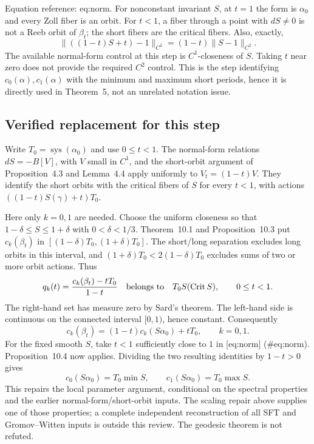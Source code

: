 \documentclass[10pt]{article}
\begin{document}
Equation reference: eq:norm. For nonconstant invariant \(S\), at \(t=1\) the form is \(\alpha_0\) and every Zoll fiber is an orbit. For \(t<1\), a fiber through a point with \(dS\ne0\) is not a Reeb orbit of \(\beta_t\); the short fibers are the critical fibers. Also, exactly, \[\|((1-t)S+t)-1\|_{C^2}=(1-t)\|S-1\|_{C^2}.
 \] The available normal-form control at this step is \(C^1\)-closeness of \(S\). Taking \(t\) near zero does not provide the required \(C^2\) control. This is the step identifying \(c_0(\alpha),c_1(\alpha)\) with the minimum and maximum short periods, hence it is directly used in Theorem 5, not an unrelated notation issue.\par
\subsection*{Verified replacement for this step}
Write \(T_0=\operatorname{sys}(\alpha_0)\) and use \(0\le t<1\). The normal-form relations \(dS=-B[V]\), with \(V\) small in \(C^1\), and the short-orbit argument of Proposition 4.3 and Lemma 4.4 apply uniformly to \(V_t=(1-t)V\). They identify the short orbits with the critical fibers of \(S\) for every \(t<1\), with actions \(((1-t)S(\gamma)+t)T_0\).\par
Here only \(k=0,1\) are needed. Choose the uniform closeness so that \(1-\delta\le S\le1+\delta\) with \(0<\delta<1/3\). Theorem 10.1 and Proposition 10.3 put \(c_k(\beta_t)\) in \([(1-\delta)T_0,(1+\delta)T_0]\). The short/long separation excludes long orbits in this interval, and \((1+\delta)T_0<2(1-\delta)T_0\) excludes sums of two or more orbit actions. Thus \[q_k(t)=\frac{c_k(\beta_t)-tT_0}{1-t}
 \quad\hbox{belongs to}\quad T_0 S(\operatorname{Crit}S),\qquad 0\le t<1.\] The right-hand set has measure zero by Sard’s theorem. The left-hand side is continuous on the connected interval \([0,1)\), hence constant. Consequently \[c_k(\beta_t)=(1-t)c_k(S\alpha_0)+tT_0,\qquad k=0,1.\] For the fixed smooth \(S\), take \(t<1\) sufficiently close to \(1\) in [eq:norm] (\#eq:norm). Proposition 10.4 now applies. Dividing the two resulting identities by \(1-t>0\) gives \[c_0(S\alpha_0)=T_0\min S,\qquad
 c_1(S\alpha_0)=T_0\max S.\] This repairs the local parameter argument, conditional on the spectral properties and the earlier normal-form/short-orbit inputs. The scaling repair above supplies one of those properties; a complete independent reconstruction of all SFT and Gromov–Witten inputs is outside this review. The geodesic theorem is not refuted.\par
\end{document}
